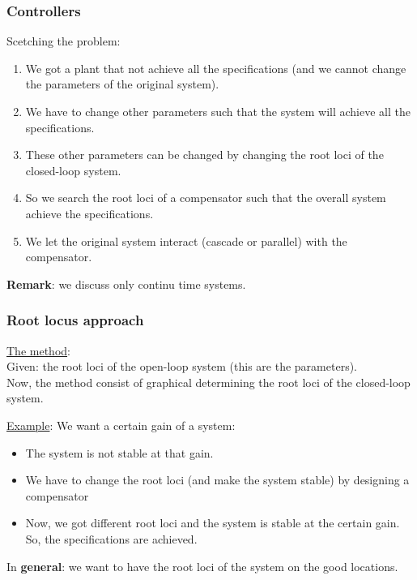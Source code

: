\begin{frame}
	\frametitle{Controllers}
		Scetching the problem:
		\begin{enumerate}
			\item We got a plant that not achieve all the specifications (and we cannot change the parameters of the original system).
			\item We have to change other parameters such that the system will achieve all the specifications.
			\item These other parameters can be changed by changing the root loci of the closed-loop system. 
			\item So we search the root loci of a compensator such that the overall system achieve the specifications. 
			\item We let the original system interact (cascade or parallel) with the compensator.
		\end{enumerate}
		\vspace{3mm}
		
		\textbf{Remark}: we discuss only continu time systems. 
\end{frame}

\begin{frame}
	\frametitle{Root locus approach}
	\underline{The method}:\\
	Given: the root loci of the open-loop system (this are the parameters).\\
	Now, the method consist of graphical determining the root loci of the closed-loop system.\vspace{3mm}

	\underline{Example}: 
	We want a certain gain of a system:
	\begin{itemize}
		\item The system is not stable at that gain.
		\item We have to change the root loci (and make the system stable) by designing a compensator
		\item Now, we got different root loci and the system is stable at the certain gain. So, the specifications are achieved.
	\end{itemize}
	\vspace{2mm}
	
	In \textbf{general}: we want to have the root loci of the system on the good locations.
\end{frame}













